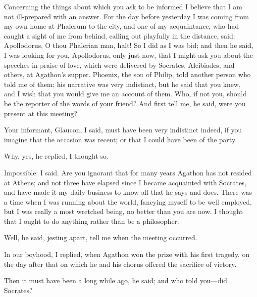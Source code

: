 

\para[1] Concerning the things about which you ask to be informed I believe that I am not ill-prepared with an answer. For the day before yesterday I was coming from my own home at Phalerum to the city, and one of my acquaintance, who had caught a sight of me from behind, calling out playfully in the distance, said: Apollodorus, O thou Phalerian man, halt! So I did as I was bid; and then he said, I was looking for you, Apollodorus, only just now, that I might ask you about the speeches in praise of love, which were delivered by Socrates, Alcibiades, and others, at Agathon's supper. Phoenix, the son of Philip, told another person who told me of them; his narrative was very indistinct, but he said that you knew, and I wish that you would give me an account of them. Who, if not you, should be the reporter of the words of your friend? And first tell me, he said, were you present at this meeting?

\para[2] Your informant, Glaucon, I said, must have been very indistinct indeed, if you imagine that the occasion was recent; or that I could have been of the party.

\para[3] Why, yes, he replied, I thought so.

\para[4] Impossible: I said. Are you ignorant that for many years Agathon has not resided at Athens; and not three have elapsed since I became acquainted with Socrates, and have made it my daily business to know all that he says and does. There was a time when I was running about the world, fancying myself to be well employed, but I was really a most wretched being, no better than you are now. I thought that I ought to do anything rather than be a philosopher.

\para[5] Well, he said, jesting apart, tell me when the meeting occurred.

\para[6] In our boyhood, I replied, when Agathon won the prize with his first tragedy, on the day after that on which he and his chorus offered the sacrifice of victory.

\para[7] Then it must have been a long while ago, he said; and who told you---did Socrates?

